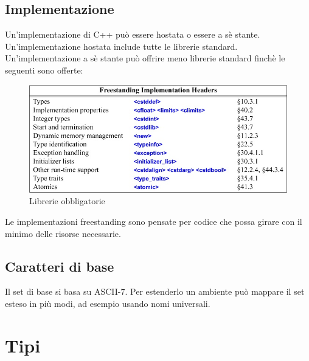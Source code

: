 \documentclass[11pt,a4paper]{book}
\begin{document}
\subsection{Implementazione}
Un'implementazione di C++ può essere hostata o essere a sè stante. Un'implementazione hostata include tutte le librerie standard. Un'implementazione a sè stante può offrire meno librerie standard finchè le seguenti sono offerte:
\begin{figure}[h!]
	\begin{center}
		\includegraphics[scale=0.6]{img/008.jpg}
		\caption{Librerie obbligatorie}
		\label{fig: 008}
	\end{center}
\end{figure}

Le implementazioni freestanding sono pensate per codice che possa girare con il minimo delle risorse necessarie.

\subsection{Caratteri di base}
Il set di base si basa su ASCII-7. Per estenderlo un ambiente può mappare il set esteso in più modi, ad esempio usando nomi universali.

\section{Tipi}
\end{document}
